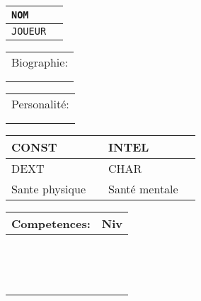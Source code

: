 \documentclass[a4paper,landscape,twocolumn]{book}
\begin{document}

\noindent\begin{tabularx}{\columnwidth}{|l|X|}
	\hline
	\cellcolor{black!10} 
	\texttt{NOM}& \\
	\hline
	\cellcolor{black!10} 
	\texttt{JOUEUR}&\\
	\hline
\end{tabularx}


\noindent\begin{tabularx}{\columnwidth}{|X|}
	\hline
	\cellcolor{black!10} 
	Biographie:\\
	 \\[180pt]  \\ \hline
\end{tabularx}


\noindent\begin{tabularx}{\columnwidth}{|X|}
	\hline
	\cellcolor{black!10} 
	Personalité: \\
	 \\[190pt]  \\ \hline
\end{tabularx}


\pagebreak

\noindent\begin{tabularx}{\columnwidth}{|l|X|l|X|}
	\hline
	\cellcolor{black!10} 
	CONST &   &	
	\cellcolor{black!10} 
	INTEL &  \\
	\hline
	\cellcolor{black!10} 
	DEXT &  & 
	\cellcolor{black!10} 	
	CHAR &   \\ 
	\hline
	\cellcolor{black!10} 
	Sante physique& &
	\cellcolor{black!10} 
	Santé mentale &   \\
	\hline
\end{tabularx}

\noindent\begin{tabularx}{\columnwidth}{|X|r|}
	\hline
	\cellcolor{black!10} 
	Competences: & 
	\cellcolor{black!10} 
	Niv\\ \hline
	 & \\ \hline
	 & \\ \hline
	 & \\ \hline
	 & \\ \hline
	 & \\ \hline
	 & \\ \hline
	 & \\ \hline
	 & \\ \hline
	 & \\ \hline
	 & \\ \hline
	 & \\ \hline
	 & \\ \hline
	 & \\ \hline
	 & \\ \hline
\end{tabularx}
\end{document}

